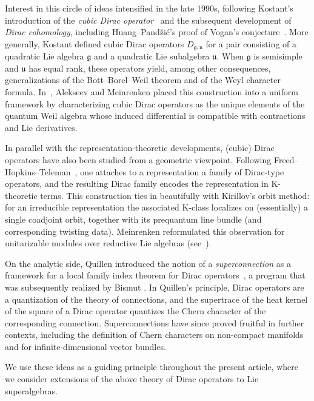 \documentclass[11pt]{amsart}
\def\gg{{\mathfrak{g}}}
\theoremstyle{plain}
\theoremstyle{remark}
\theoremstyle{definition}
\numberwithin{equation}{section}
\theoremstyle{remark}
\begin{document}
Interest in this circle of ideas intensified in the late 1990s, following Kostant's
introduction of the \emph{cubic Dirac operator}~\cite{Kostant_cubic_Dirac} and the
subsequent development of \emph{Dirac cohomology}, including Huang--Pand\v zi\'c's proof
of Vogan's conjecture~\cite{huang2002dirac}. More generally, Kostant defined cubic Dirac
operators $D_{\gg,\mathfrak{u}}$ for a pair consisting of a quadratic Lie algebra
$\gg$ and a quadratic Lie subalgebra $\mathfrak{u}$. When $\gg$ is
semisimple and $\mathfrak{u}$ has equal rank, these operators yield, among other
consequences, generalizations of the Bott--Borel--Weil theorem and of the Weyl character
formula. In~\cite{Alekseev_Meinrenken}, Alekseev and Meinrenken placed this construction
into a uniform framework by characterizing cubic Dirac operators as the unique elements
of the quantum Weil algebra whose induced differential is compatible with contractions
and Lie derivatives. 

In parallel with the representation-theoretic developments, (cubic) Dirac operators have
also been studied from a geometric viewpoint. Following Freed--Hopkins--Teleman~\cite{FT2}, one attaches to a representation a family of Dirac-type operators, and the resulting Dirac family encodes the representation in K-theoretic terms. This construction ties in beautifully with Kirillov’s orbit method: for an irreducible representation the associated K-class localizes on (essentially) a single coadjoint orbit, together with its prequantum line bundle (and corresponding twisting data). Meinrenken reformulated this observation for unitarizable modules over reductive Lie algebras (see~\cite[Section~8.6]{Meinrenken_Clifford_algebras}). 

On the analytic side, Quillen introduced the notion of a \emph{superconnection} as a
framework for a local family index theorem for Dirac operators~\cite{Quillen_superconnections},
a program that was subsequently realized by Bismut \cite{Bismut_superconnection}. In Quillen's principle, Dirac
operators are a quantization of the theory of connections, and the supertrace of the heat
kernel of the square of a Dirac operator quantizes the Chern character of the corresponding
connection. Superconnections have since proved fruitful in further contexts, including the
definition of Chern characters on non-compact manifolds and for infinite-dimensional vector
bundles.

We use these ideas as a guiding principle throughout the present article, where we consider extensions of the above theory of Dirac operators to Lie superalgebras.
\end{document}
